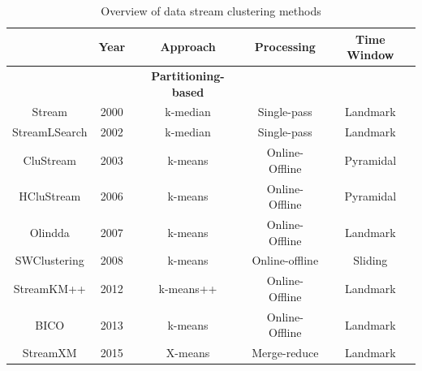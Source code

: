 






\begin{table}[h]
    \centering
    \caption{ Overview of data stream clustering methods \protect\cite{mansalis2018evaluation}}
    \label{landmarkwin}
    \small
    \begin{tabular}{c c c c c}
    \hline
      \normalsize{\textbf{Algorithms} & \textbf{Year} & \textbf{ Approach } & \textbf{Processing} & \textbf{ Time Window}}  \\
     \hline \midrule
      \rowcolor{lightgray}& &\rowcolor{lightgray}\centering \textbf{Partitioning-based }  & &  \\
      \hline 
      \hline
      Stream             &   2000    &   k-median     &  Single-pass       & Landmark \\
     \hline
      StreamLSearch      &   2002    &   k-median     &   Single-pass      & Landmark \\
    \hline
     CluStream           &   2003    &  k-means       &  Online-Offline    & Pyramidal \\
    \hline   
     HCluStream         &    2006   &    k-means     & Online-Offline      & Pyramidal \\
    \hline
     Olindda            &   2007    &   k-means      &   Online-Offline    & Landmark  \\
    \hline    
     SWClustering        &    2008   &    k-means     &  Online-offline    & Sliding   \\
       \hline
      StreamKM++         &    2012   &   k-means++    & Online-Offline     & Landmark   \\
    \hline 
      BICO               &    2013   &    k-means     &  Online-Offline    & Landmark  \\
      \hline
      StreamXM           &    2015   &    X-means     &  Merge-reduce    & Landmark  \\

\end{tabular}
\end{table}
